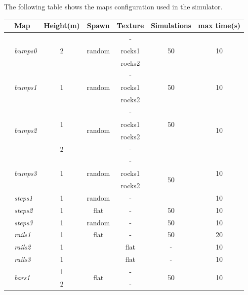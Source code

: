 \documentclass[../document.tex]{subfiles}
\begin{document}
The following table shows the maps configuration used in the simulator.
\begin{table} [htbp]
    \centering
    
    \begin{tabular}[]{@{}llccccc@{}}
      \toprule
      & Map & Height(m) & Spawn & Texture & Simulations & max time(s) \\ 
      \hline
      &\multirow{3}{*}{\emph{bumps0}} & \multirow{3}{*}{2} & \multirow{3}{*}{random} &- & \multirow{3}{*}{50} & \multirow{3}{*}{10} \\
      &&&& rocks1 &  &  \\ 
      &&&& rocks2 &  &  \\ 
      \hline
      &\multirow{3}{*}{\emph{bumps1}} & \multirow{3}{*}{1} & \multirow{3}{*}{random}& - & \multirow{3}{*}{50} & \multirow{3}{*}{10} \\
      &&&& rocks1 &  &  \\ 
      &&&& rocks2 &  &  \\ 
      \hline
      &\multirow{4}{*}{\emph{bumps2}} & \multirow{3}{*}{1} & \multirow{4}{*}{random} &- & \multirow{3}{*}{50} & \multirow{4}{*}{10} \\
      &&&& rocks1 &  &  \\ 
      &&&& rocks2 &  &  \\ 
      && 2 && - &  &  \\ 
      \hline
      &\multirow{3}{*}{\emph{bumps3}} & \multirow{3}{*}{1}& \multirow{3}{*}{random} & - & \multirow{4}{*}{50} & \multirow{3}{*}{10} \\
      &&&& rocks1 &  &  \\ 
      &&&& rocks2 &  &  \\ 
      \hline
      &\emph{steps1} & 1 &random & - & 50 & 10 \\
      \hline
      &\emph{steps2} & 1 &flat & - & 50  &  10\\
      \hline
      &\emph{steps3} & 1 &random & - & 50  &  10\\
      \hline
      &\emph{rails1} & 1 & flat & - & 50 & 20 \\
      \hline
      &\emph{rails2} & 1 && flat & - & 10 \\
      \hline
      &\emph{rails3} & 1 &&  flat&  - & 10 \\
      \hline
      &\multirow{2}{*}{\emph{bars1}} & 1 & \multirow{2}{*}{flat} & - & \multirow{2}{*}{50} & \multirow{2}{*}{10} \\
      && 2 &  & - &  &  \\

\end{tabular}
\end{table}
\end{document}
